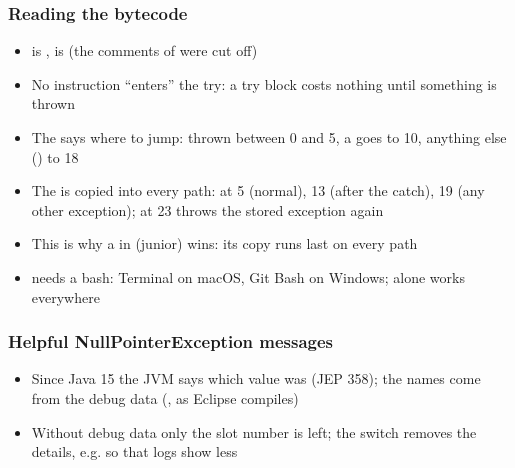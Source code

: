 \documentclass[aspectratio=169,10pt,compress]{beamer}
\begin{document}
\begin{frame}[t,fragile] \frametitle{Reading the bytecode}
	\begin{itemize}\small
		\item {} is ,  is  (the comments of  were cut off)
		\item No instruction ``enters'' the try: a try block costs nothing until something is thrown
		\item The  says where to jump: thrown between 0 and 5, a  goes to 10,
			  anything else () to 18
		\item The  is copied into every path: at 5 (normal), 13 (after the catch), 19 (any other exception);
			  at 23  throws the stored exception again
		\item This is why a  in  (junior) wins: its copy runs last on every path
		\item {} needs a bash: Terminal on macOS, Git Bash on Windows;  alone works everywhere
	\end{itemize}
\end{frame}




\begin{frame}[t,fragile] \frametitle{Helpful NullPointerException messages}

	\begin{itemize}\footnotesize
		\item<2-> Since Java 15 the JVM says which value was  (JEP 358); the names come from the debug data (, as Eclipse compiles)
		\item<2-> Without debug data only the slot number is left; the switch removes the details, e.g. so that logs show less
	\end{itemize}
\end{frame}
\end{document}

